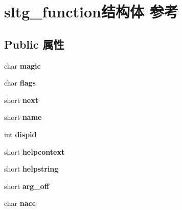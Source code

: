 \hypertarget{structsltg__function}{}\section{sltg\+\_\+function结构体 参考}
\label{structsltg__function}
\subsection*{Public 属性}
\begin{DoxyCompactItemize}
\item 
\mbox{\label{structsltg__function_a0f91710aa7b522993604256fc9598aca}} 
char {\bfseries magic}
\item 
\mbox{\label{structsltg__function_ad67243091c691f5a90d38709aed2e71b}} 
char {\bfseries flags}
\item 
\mbox{\label{structsltg__function_a100380d7ac64bc08d3fae34b5e5a00f5}} 
short {\bfseries next}
\item 
\mbox{\label{structsltg__function_a2a7aada6abde293d57bac22e0ed5b256}} 
short {\bfseries name}
\item 
\mbox{\label{structsltg__function_a11d6088c3a604950210acebe1c4def4d}} 
int {\bfseries dispid}
\item 
\mbox{\label{structsltg__function_a641cacfe11f9d9e71642d68c535449a1}} 
short {\bfseries helpcontext}
\item 
\mbox{\label{structsltg__function_a68da5a03d2b294f54a0a0fe820d411e2}} 
short {\bfseries helpstring}
\item 
\mbox{\label{structsltg__function_af53dd8b478a413fb7e08219af15497b5}} 
short {\bfseries arg\+\_\+off}
\item 
\mbox{\label{structsltg__function_a2a4a36293ee38bf8997c7257aad272aa}} 
char {\bfseries nacc}
\item 
\mbox{\label{structsltg__function_a13c1cdff2198ad9b26e50f497d7dd433}} 

\end{DoxyCompactItemize}
